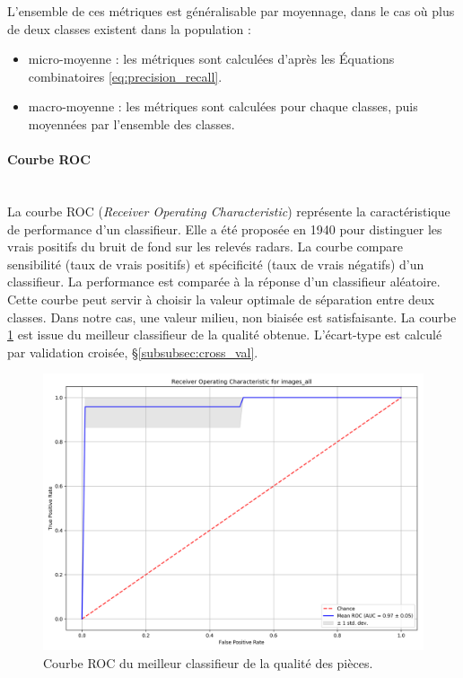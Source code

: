 L'ensemble de ces métriques est généralisable par moyennage, dans le cas où plus de deux classes existent dans la population :
\begin{itemize}
\item micro-moyenne : les métriques sont calculées d'après les Équations combinatoires \ref{eq:precision_recall}.
\item macro-moyenne : les métriques sont calculées pour chaque classes, puis moyennées par l'ensemble des classes.
\end{itemize}

\paragraph{Courbe ROC}\mbox{} \\
La courbe ROC (\textit{Receiver Operating Characteristic}) représente la caractéristique de performance d'un classifieur.
Elle a été proposée en 1940 pour distinguer les vrais positifs du bruit de fond sur les relevés radars.
La courbe compare sensibilité (taux de vrais positifs) et spécificité (taux de vrais négatifs) d'un classifieur.
La performance est comparée à la réponse d'un classifieur aléatoire.
Cette courbe peut servir à choisir la valeur optimale de séparation entre deux classes.
Dans notre cas, une valeur milieu, non biaisée est satisfaisante.
La courbe \ref{fig:roc} est issue du meilleur classifieur de la qualité obtenue.
L'écart-type est calculé par validation croisée, §\ref{subsubsec:cross_val}.

\begin{figure}[hbtp]
    \centering
    \includegraphics[width=\textwidth,height=\textheight,keepaspectratio]{../Chap4/Figures/roc_images_all_224_3cams_densenet_conv4_PCA20.png}
    \caption{Courbe ROC du meilleur classifieur de la qualité des pièces.}
    \label{fig:roc}
\end{figure}

